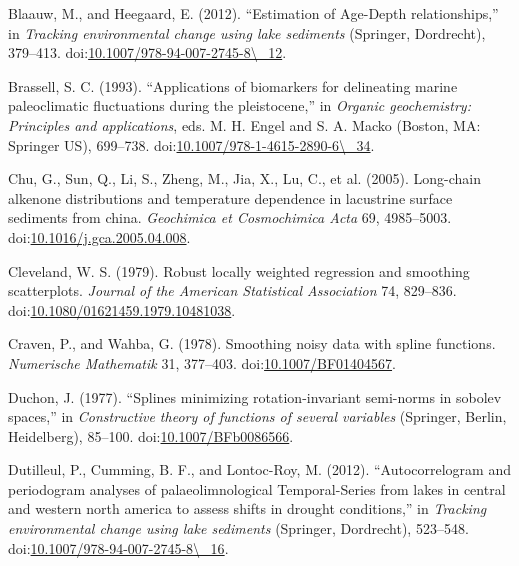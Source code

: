 \documentclass[12pt,]{article}
\begin{document}
\hypertarget{ref-Blaauw2012-yq}{}
Blaauw, M., and Heegaard, E. (2012). ``Estimation of Age-Depth
relationships,'' in \emph{Tracking environmental change using lake
sediments} (Springer, Dordrecht), 379--413.
doi:\href{https://doi.org/10.1007/978-94-007-2745-8/_12}{10.1007/978-94-007-2745-8\textbackslash{}\_12}.

\hypertarget{ref-Brassell1993-fw}{}
Brassell, S. C. (1993). ``Applications of biomarkers for delineating
marine paleoclimatic fluctuations during the pleistocene,'' in
\emph{Organic geochemistry: Principles and applications}, eds. M. H.
Engel and S. A. Macko (Boston, MA: Springer US), 699--738.
doi:\href{https://doi.org/10.1007/978-1-4615-2890-6/_34}{10.1007/978-1-4615-2890-6\textbackslash{}\_34}.

\hypertarget{ref-Chu2005-es}{}
Chu, G., Sun, Q., Li, S., Zheng, M., Jia, X., Lu, C., et al. (2005).
Long-chain alkenone distributions and temperature dependence in
lacustrine surface sediments from china. \emph{Geochimica et
Cosmochimica Acta} 69, 4985--5003.
doi:\href{https://doi.org/10.1016/j.gca.2005.04.008}{10.1016/j.gca.2005.04.008}.

\hypertarget{ref-Cleveland1979-vf}{}
Cleveland, W. S. (1979). Robust locally weighted regression and
smoothing scatterplots. \emph{Journal of the American Statistical
Association} 74, 829--836.
doi:\href{https://doi.org/10.1080/01621459.1979.10481038}{10.1080/01621459.1979.10481038}.

\hypertarget{ref-Craven1978-nz}{}
Craven, P., and Wahba, G. (1978). Smoothing noisy data with spline
functions. \emph{Numerische Mathematik} 31, 377--403.
doi:\href{https://doi.org/10.1007/BF01404567}{10.1007/BF01404567}.

\hypertarget{ref-Duchon1977-jr}{}
Duchon, J. (1977). ``Splines minimizing rotation-invariant semi-norms in
sobolev spaces,'' in \emph{Constructive theory of functions of several
variables} (Springer, Berlin, Heidelberg), 85--100.
doi:\href{https://doi.org/10.1007/BFb0086566}{10.1007/BFb0086566}.

\hypertarget{ref-Dutilleul2012-su}{}
Dutilleul, P., Cumming, B. F., and Lontoc-Roy, M. (2012).
``Autocorrelogram and periodogram analyses of palaeolimnological
Temporal-Series from lakes in central and western north america to
assess shifts in drought conditions,'' in \emph{Tracking environmental
change using lake sediments} (Springer, Dordrecht), 523--548.
doi:\href{https://doi.org/10.1007/978-94-007-2745-8/_16}{10.1007/978-94-007-2745-8\textbackslash{}\_16}.
\end{document}
